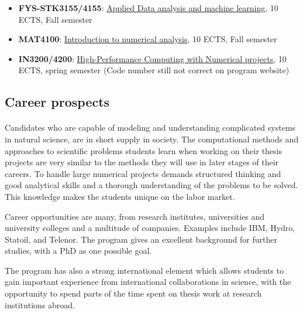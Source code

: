 \documentclass[%
oneside,                 %
final,                   %
10pt]{article}
\begin{document}
\begin{itemize}
\item \textbf{FYS-STK3155/4155}: \href{{https://www.uio.no/studier/emner/matnat/fys/FYS-STK4155/index-eng.html}}{Applied Data analysis and machine learning}, 10 ECTS, Fall semester

\item \textbf{MAT4100}: \href{{https://www.uio.no/studier/emner/matnat/math/MAT4110/index-eng.html}}{Introduction to numerical analysis}, 10 ECTS, Fall semester

\item \textbf{IN3200/4200}: \href{{https://www.uio.no/studier/emner/matnat/ifi/IN3200/index-eng.html}}{High-Performance Computing with Numerical projects}, 10 ECTS, spring semester (Code number still not correct on program website)
\end{itemize}

\noindent





\subsection{Career prospects}


\paragraph{}
Candidates who are capable of modeling and understanding complicated
systems in natural science, are in short supply in society.  The
computational methods and approaches to scientific problems students learn
when working on their thesis projects are very similar to the methods
they will use in later stages of their careers.  To handle large
numerical projects demands structured thinking and good analytical
skills and a thorough understanding of the problems to be solved. This
knowledge makes the students unique on the labor market.

Career opportunities are many, from research institutes, universities
and university colleges and a multitude of companies. Examples
include IBM, Hydro, Statoil, and Telenor.  The program gives an
excellent background for further studies, with a PhD as one possible
goal.

The program has also a strong international element which allows students to
gain important experience from international collaborations in
science, with the opportunity to spend parts of the time spent on
thesis work at research institutions abroad.
\end{document}
